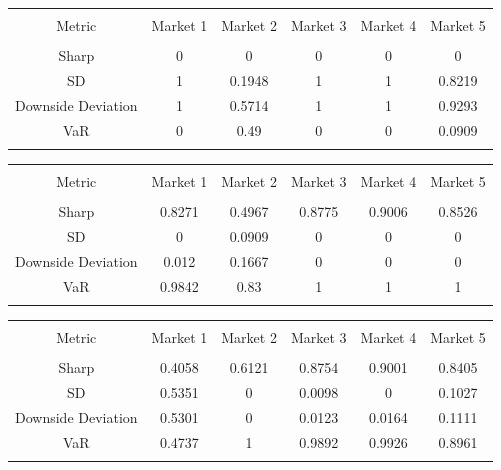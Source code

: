 \documentclass[11pt,preprint, authoryear]{elsarticle}
\let\origtable\table
\let\endorigtable\endtable
\renewenvironment{table}[1][2] {
    \expandafter\origtable\expandafter[H]
} {
    \endorigtable
}
\numberwithin{equation}{section}
\numberwithin{figure}{section}
\numberwithin{table}{section}
\begin{document}
\begin{table}[!htbp] \centering 
  \caption{Minimum Variance} 
  \label{mv} 
\begin{tabular}{@{\extracolsep{5pt}} cccccc} 
\\[-1.8ex]\hline 
\hline \\[-1.8ex] 
Metric & Market 1 & Market 2 & Market 3 & Market 4 & Market 5 \\ 
\hline \\[-1.8ex] 
Sharp & 0 & 0 & 0 & 0 & 0 \\ 
SD & 1 & 0.1948 & 1 & 1 & 0.8219 \\ 
Downside Deviation & 1 & 0.5714 & 1 & 1 & 0.9293 \\ 
VaR & 0 & 0.49 & 0 & 0 & 0.0909 \\ 
\hline \\[-1.8ex] 
\end{tabular} 
\end{table}

\begin{table}[!htbp] \centering 
  \caption{Inverse Volatility} 
  \label{iv} 
\begin{tabular}{@{\extracolsep{5pt}} cccccc} 
\\[-1.8ex]\hline 
\hline \\[-1.8ex] 
Metric & Market 1 & Market 2 & Market 3 & Market 4 & Market 5 \\ 
\hline \\[-1.8ex] 
Sharp & 0.8271 & 0.4967 & 0.8775 & 0.9006 & 0.8526 \\ 
SD & 0 & 0.0909 & 0 & 0 & 0 \\ 
Downside Deviation & 0.012 & 0.1667 & 0 & 0 & 0 \\ 
VaR & 0.9842 & 0.83 & 1 & 1 & 1 \\ 
\hline \\[-1.8ex] 
\end{tabular} 
\end{table}

\begin{table}[!htbp] \centering 
  \caption{Equal Risk Contribution} 
  \label{erc} 
\begin{tabular}{@{\extracolsep{5pt}} cccccc} 
\\[-1.8ex]\hline 
\hline \\[-1.8ex] 
Metric & Market 1 & Market 2 & Market 3 & Market 4 & Market 5 \\ 
\hline \\[-1.8ex] 
Sharp & 0.4058 & 0.6121 & 0.8754 & 0.9001 & 0.8405 \\ 
SD & 0.5351 & 0 & 0.0098 & 0 & 0.1027 \\ 
Downside Deviation & 0.5301 & 0 & 0.0123 & 0.0164 & 0.1111 \\ 
VaR & 0.4737 & 1 & 0.9892 & 0.9926 & 0.8961 \\ 
\hline \\[-1.8ex] 
\end{tabular} 
\end{table}
\end{document}
